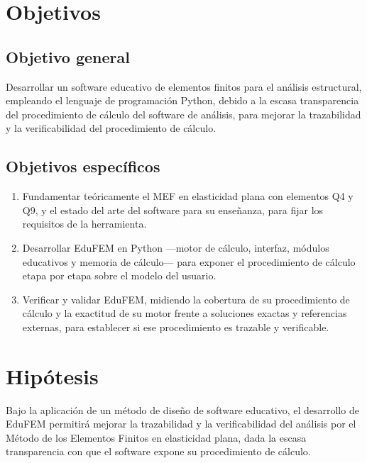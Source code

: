 \section*{Objetivos}

\subsection*{Objetivo general}

Desarrollar un software educativo de elementos finitos para el análisis estructural, empleando el lenguaje de programación Python, debido a la escasa transparencia del procedimiento de cálculo del software de análisis, para mejorar la trazabilidad y la verificabilidad del procedimiento de cálculo.

\subsection*{Objetivos específicos}

\begin{enumerate}
    \item Fundamentar teóricamente el MEF en elasticidad plana con elementos Q4 y Q9, y el estado del arte del software para su enseñanza, para fijar los requisitos de la herramienta.
    \item Desarrollar EduFEM en Python ---motor de cálculo, interfaz, módulos educativos y memoria de cálculo--- para exponer el procedimiento de cálculo etapa por etapa sobre el modelo del usuario.
    \item Verificar y validar EduFEM, midiendo la cobertura de su procedimiento de cálculo y la exactitud de su motor frente a soluciones exactas y referencias externas, para establecer si ese procedimiento es trazable y verificable.
\end{enumerate}

\section*{Hipótesis}

Bajo la aplicación de un método de diseño de software educativo, el desarrollo de EduFEM permitirá mejorar la trazabilidad y la verificabilidad del análisis por el Método de los Elementos Finitos en elasticidad plana, dada la escasa transparencia con que el software expone su procedimiento de cálculo.

